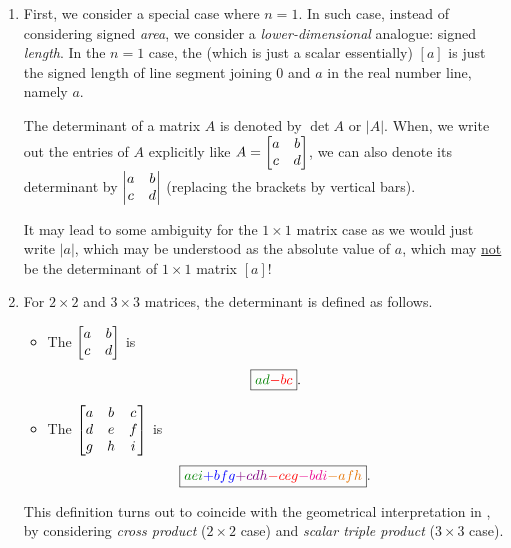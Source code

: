 \begin{enumerate}
\begin{center}
\begin{tikzpicture}
\end{tikzpicture}
\end{center}
\item First, we consider a special case where \(n=1\). In such case, instead of
considering signed \emph{area}, we consider a \emph{lower-dimensional}
analogue: signed \emph{length}. In the \(n=1\) case, the  (which is just a scalar essentially) \([a]\) is just
the signed length of line segment joining \(0\) and \(a\) in the real number
line, namely \(\boxed{a}\).
\begin{center}
\end{center}
\begin{note}
The determinant of a matrix \(A\) is denoted by \(\det A\) or \(|A|\).
When, we
write out the entries of \(A\) explicitly like \(A=\mqty[a&b\\ c&d]\), we can
also denote its determinant by \(\mqty|a&b\\ c&d|\) (replacing the brackets by
vertical bars).
\begin{warning}
It may lead to some ambiguity for the \(1\times 1\) matrix case as we would
just write \(|a|\), which may be understood as the absolute value of \(a\),
which may \underline{not} be the determinant of \(1\times 1\) matrix \([a]\)!
\end{warning}
\end{note}
\item For \(2\times 2\) and \(3\times 3\) matrices, the determinant is defined
as follows. 
\begin{itemize}
\item The  \(\mqty[a&b\\ c&d]\) is
\[
\boxed{\gc{ad}\rc{-bc}}.
\]
\item The  \(\mqty[a&b&c\\ d&e&f\\ g&h&i]\) is
\[
\boxed{\gc{aei}\blc{+bfg}\vc{+cdh}\rc{-ceg}\mgc{-bdi}\orc{-afh}}.
\]
\end{itemize}
This definition turns out to coincide with the geometrical
interpretation in , by considering \emph{cross product}
(\(2\times 2\) case) and \emph{scalar triple product} (\(3\times 3\) case).


\end{enumerate}
